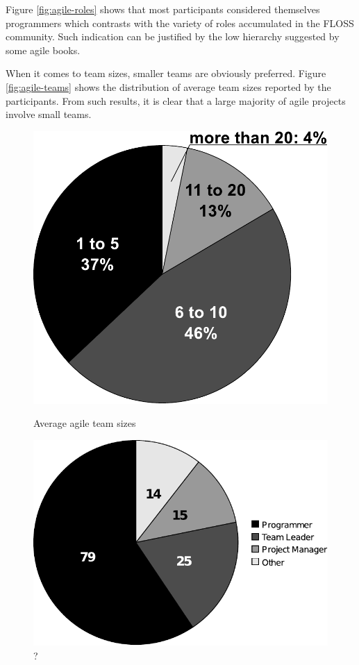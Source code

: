 \documentclass[lnbip]{svmultln}
\begin{document}
Figure \ref{fig:agile-roles} shows that most participants considered
themselves programmers which contrasts with the variety of roles
accumulated in the FLOSS community. Such indication can be justified
by the low hierarchy suggested by some agile books.

When it comes to team sizes, smaller teams are obviously
preferred. Figure \ref{fig:agile-teams} shows the distribution of
average team sizes reported by the participants. From such results, it
is clear that a large majority of agile projects involve small teams.

\begin{figure}[htb]
  \begin{minipage}[t]{0.55\linewidth}
    \centering
    \includegraphics[scale=.3]{agile-teams.pdf}
    \caption{Average agile team sizes}
    \label{fig:agile-teams}
  \end{minipage}
  \begin{minipage}[t]{0.45\linewidth}
    \centering
    \includegraphics[scale=.45]{agile-roles.pdf}
    \caption{?}
    \label{fig:?}
  \end{minipage}
\end{figure}
\end{document}
